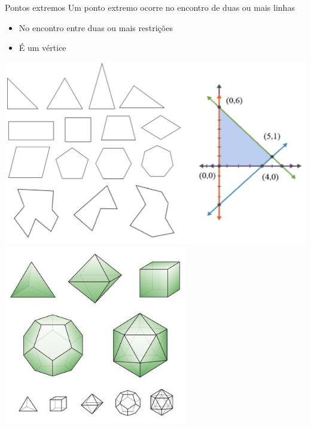 \documentclass[compress,mathserif]{beamer}
\begin{document}
\begin{frame}{Pontos extremos}
Um ponto extremo ocorre no encontro de duas ou mais linhas
\begin{itemize}
    \item No encontro entre duas ou mais restrições
    \item É um vértice
\end{itemize}

\begin{overprint}
\centering \includegraphics[width=\textwidth]{images/poligonos.png}
\centering\includegraphics[width=0.60\textwidth]{images/poliedro.jpg}
\end{overprint}

\end{frame}

\end{document}
